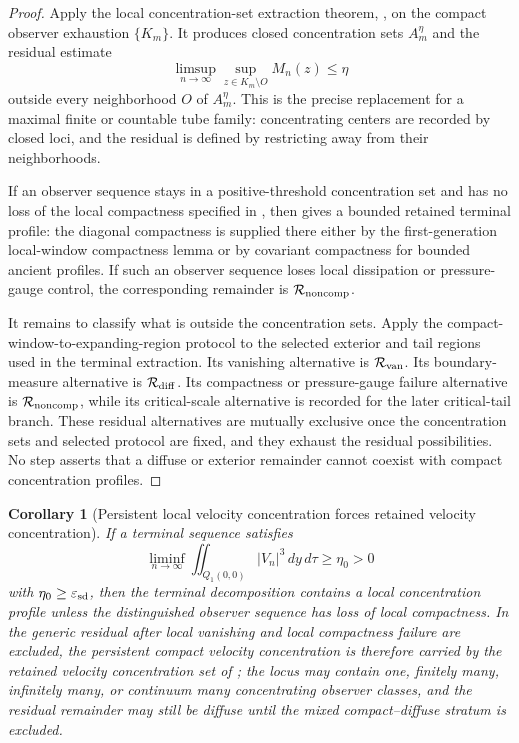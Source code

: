 \documentclass[11pt]{amsart}
\numberwithin{equation}{section}
\theoremstyle{plain}
\newtheorem{corollary}[corollary]{Corollary}
\theoremstyle{definition}
\theoremstyle{remark}
\newcommand{\eps}{\varepsilon}
\begin{document}
\begin{proof}
Apply the local concentration-set extraction theorem,
, on the compact observer exhaustion
\(\{K_m\}\).  It produces closed concentration sets \(A_m^\eta\) and the residual
estimate
\[
   \limsup_{n\to\infty}
   \sup_{z\in K_m\setminus O}M_n(z)\le\eta
\]
outside every neighborhood \(O\) of \(A_m^\eta\).  This is the precise
replacement for a maximal finite or countable tube family: concentrating centers are
recorded by closed loci, and the residual is defined by restricting away from
their neighborhoods.

If an observer sequence stays in a positive-threshold concentration set and has no
loss of the local compactness specified in , then
 gives a bounded retained terminal profile:
the diagonal compactness is supplied there either by the first-generation
local-window compactness lemma or by covariant compactness for bounded ancient profiles.  If such an observer
sequence loses local dissipation or pressure-gauge control, the corresponding
remainder is \(\mathcal R_{\rm noncomp}\).

It remains to classify what is outside the concentration sets.  Apply the
compact-window-to-expanding-region protocol
 to the selected exterior and
tail regions used in the terminal extraction.  Its vanishing alternative is
\(\mathcal R_{\rm van}\).  Its boundary-measure alternative is
\(\mathcal R_{\rm diff}\).  Its compactness or pressure-gauge failure
alternative is \(\mathcal R_{\rm noncomp}\), while its critical-scale
alternative is recorded for the later critical-tail branch.  These residual
alternatives are mutually exclusive once the concentration sets and selected protocol
are fixed, and they exhaust the residual possibilities.  No step asserts that a
diffuse or exterior remainder cannot coexist with compact concentration
profiles.
\end{proof}

\begin{corollary}[Persistent local velocity concentration forces retained velocity concentration]
\label{cor:persistent-forces-active}
If a terminal sequence satisfies
\[
   \liminf_{n\to\infty}
   \iint_{Q_1(0,0)} |V_n|^3\,dy\,d\tau\ge\eta_0>0
\]
with \(\eta_0\ge\eps_{\rm sd}\), then the terminal decomposition contains a
local concentration profile unless the distinguished observer sequence has
loss of local compactness.  In the generic residual after local vanishing and
local compactness failure are excluded, the persistent compact velocity concentration is
therefore carried by the retained velocity concentration set of
; the locus may contain one, finitely many,
infinitely many, or continuum many concentrating observer classes, and the residual
remainder may still be diffuse until the mixed compact--diffuse stratum is
excluded.
\end{corollary}
\end{document}
